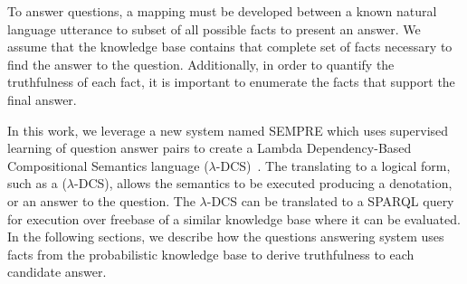 To answer questions, a mapping must be developed between a known
natural language utterance to subset of all possible facts to present an answer.
We assume that the knowledge base contains that complete set of facts necessary
to find the answer to the question.
Additionally, in order to quantify the truthfulness of each fact, it is
important to enumerate the facts that support the final answer.


In this work, we leverage a new system named SEMPRE which uses supervised
learning of question answer pairs to create a Lambda Dependency-Based
Compositional Semantics language (\(\lambda\)-DCS)~\cite{berant2013semantic}.
The translating to a logical form, such as a (\(\lambda\)-DCS), allows the
semantics to be executed producing a denotation, or an answer to the question.
The \(\lambda\)-DCS can be translated to a SPARQL query for execution over 
freebase of a similar knowledge base where it can be evaluated.
In the following sections, we describe how the questions answering system uses
facts from the probabilistic knowledge base to derive truthfulness to each
candidate answer.



